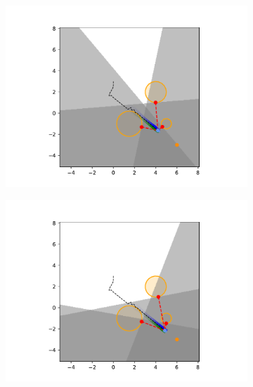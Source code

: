\begin{figure}[H]
\begin{subfigure}{0.20\textwidth}
        \includegraphics[width=\textwidth]{figures/Simulations/sim1circles/frame_7.pdf}
    \end{subfigure}%
    \hfill
    \begin{subfigure}{0.20\textwidth}
        \centering
        \includegraphics[width=\textwidth]{figures/Simulations/sim1circles/frame_8.pdf}
    \end{subfigure}%
    \hfill
    \begin{subfigure}{0.20\textwidth}
        \centering

\end{subfigure}
\end{figure}
